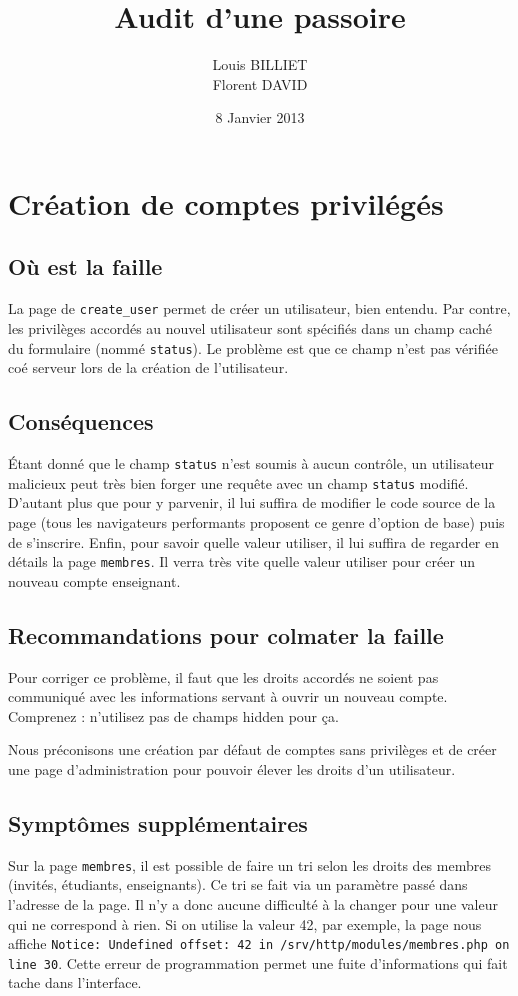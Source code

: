 \documentclass[oneside,10pt]{article}
\begin{document}
\title{Audit d'une passoire}
\author{Louis BILLIET \\ Florent DAVID}
\date{8 Janvier 2013}
\maketitle

\section{Cr\'eation de comptes privil\'eg\'es}
\subsection{O\`u est la faille}
La page de \verb+create_user+ permet de cr\'eer un utilisateur, bien entendu.
Par contre, les privil\`eges accord\'es au nouvel utilisateur sont sp\'ecifi\'es dans un champ cach\'e du formulaire (nomm\'e \verb+status+).
Le probl\`eme est que ce champ n'est pas v\'erifi\'ee co\'e serveur lors de la cr\'eation de l'utilisateur.

\subsection{Cons\'equences}
\'Etant donn\'e que le champ \verb+status+ n'est soumis \`a aucun contr\^ole, un utilisateur malicieux peut tr\`es bien forger une requ\^ete avec un champ \verb+status+ modifi\'e.
D'autant plus que pour y parvenir, il lui suffira de modifier le code source de la page (tous les navigateurs performants proposent ce genre d'option de base) puis de s'inscrire.
Enfin, pour savoir quelle valeur utiliser, il lui suffira de regarder en d\'etails la page \verb+membres+.
Il verra tr\`es vite quelle valeur utiliser pour cr\'eer un nouveau compte enseignant.

\subsection{Recommandations pour colmater la faille}
Pour corriger ce probl\`eme, il faut que les droits accord\'es ne soient pas communiqu\'e avec les informations servant \`a ouvrir un nouveau compte.
Comprenez : n'utilisez pas de champs hidden pour \c ca.


Nous pr\'econisons une cr\'eation par d\'efaut de comptes sans privil\`eges et de cr\'eer une page d'administration pour pouvoir \'elever les droits d'un utilisateur.

\subsection{Sympt\^omes suppl\'ementaires}
Sur la page \verb+membres+, il est possible de faire un tri selon les droits des membres (invit\'es, \'etudiants, enseignants).
Ce tri se fait via un param\`etre pass\'e dans l'adresse de la page.
Il n'y a donc aucune difficult\'e \`a la changer pour une valeur qui ne correspond \`a rien.
Si on utilise la valeur 42, par exemple, la page nous affiche \verb+Notice: Undefined offset: 42 in /srv/http/modules/membres.php on line 30+.
Cette erreur de programmation permet une fuite d'informations qui fait tache dans l'interface.
\end{document}
